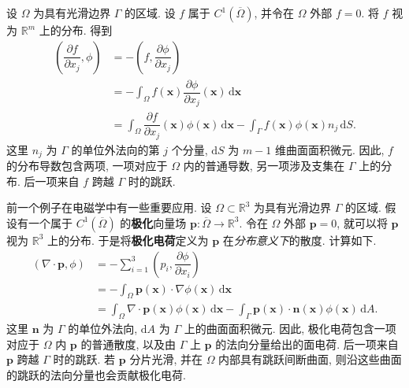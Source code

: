 \begin{Example}
\label{ex:boundary-jump-derivative}
设 $\Omega$ 为具有光滑边界 $\Gamma$ 的区域. 设 $f$ 属于 $C^1(\overline\Omega)$, 并令在 $\Omega$ 外部 $f=0$. 将 $f$ 视为 $\mathbb{R}^m$ 上的分布. 得到\[
\begin{aligned}
\left(\dfrac{\partial f}{\partial x_j},\phi\right)&=-\left(f,\dfrac{\partial\phi}{\partial x_j}\right)\\
&=-\int_\Omega f(\bm{x})\dfrac{\partial\phi}{\partial x_j}(\bm{x})\,\mathrm{d}\bm{x}\\
&=\int_\Omega\dfrac{\partial f}{\partial x_j}(\bm{x})\phi(\bm{x})\,\mathrm{d}\bm{x}
-\int_\Gamma f(\bm{x})\phi(\bm{x})n_j\,\mathrm{d}S.
\end{aligned}
\]这里 $n_j$ 为 $\Gamma$ 的单位外法向的第 $j$ 个分量, $\mathrm{d}S$ 为 $m-1$ 维曲面面积微元. 因此, $f$ 的分布导数包含两项, 一项对应于 $\Omega$ 内的普通导数, 另一项涉及支集在 $\Gamma$ 上的分布. 后一项来自 $f$ 跨越 $\Gamma$ 时的跳跃.
\end{Example}

\begin{Example}
\label{ex:polarization-charge}
前一个例子在电磁学中有一些重要应用. 设 $\Omega\subset\mathbb{R}^3$ 为具有光滑边界 $\Gamma$ 的区域. 假设有一个属于 $C^1(\overline\Omega)$ 的\textbf{极化}向量场 $\bm{p}:\overline\Omega\to\mathbb{R}^3$. 令在 $\Omega$ 外部 $\bm{p}=0$, 就可以将 $\bm{p}$ 视为 $\mathbb{R}^3$ 上的分布. 于是将\textbf{极化电荷}定义为 $\bm{p}$ 在\emph{分布意义下}的散度. 计算如下.\[
\begin{aligned}
(\nabla\cdot\bm{p},\phi)&=-\sum_{i=1}^3\left(p_i,\dfrac{\partial\phi}{\partial x_i}\right)\\
&=-\int_\Omega\bm{p}(\bm{x})\cdot\nabla\phi(\bm{x})\,\mathrm{d}\bm{x}\\
&=\int_\Omega\nabla\cdot\bm{p}(\bm{x})\phi(\bm{x})\,\mathrm{d}\bm{x}
-\int_\Gamma\bm{p}(\bm{x})\cdot\bm{n}(\bm{x})\phi(\bm{x})\,\mathrm{d}A.
\end{aligned}
\]这里 $\bm{n}$ 为 $\Gamma$ 的单位外法向, $\mathrm{d}A$ 为 $\Gamma$ 上的曲面面积微元. 因此, 极化电荷包含一项对应于 $\Omega$ 内 $\bm{p}$ 的普通散度, 以及由 $\Gamma$ 上 $\bm{p}$ 的法向分量给出的面电荷. 后一项来自 $\bm{p}$ 跨越 $\Gamma$ 时的跳跃. 若 $\bm{p}$ 分片光滑, 并在 $\Omega$ 内部具有跳跃间断曲面, 则沿这些曲面的跳跃的法向分量也会贡献极化电荷.
\end{Example}

